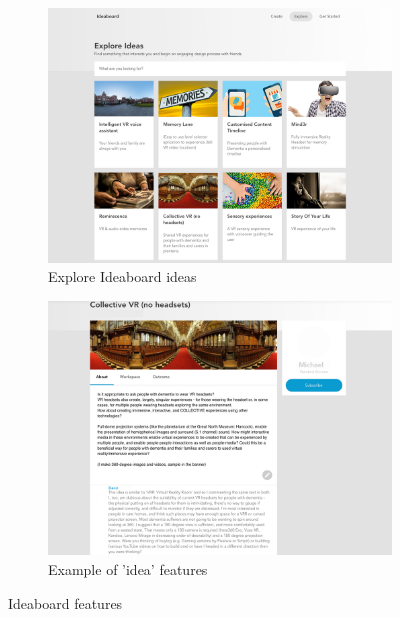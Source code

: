 \begin{figure}
\centering
\begin{subfigure}{.5\textwidth}
  \centering
  \includegraphics[width=.8\linewidth]{Images/Ideaboard Ideas.png}
  \caption{Explore Ideaboard ideas}
  \label{fig:exploreIdeaboard}
\end{subfigure}%
\begin{subfigure}{.5\textwidth}
  \centering
  \includegraphics[width=.8\linewidth]{Images/Example of idea.png}
  \caption{Example of 'idea' features}
  \label{fig:IdeaboardIdea}
\end{subfigure}
\caption{Ideaboard features}
\label{fig:IdeaboardFeatures}
\end{figure}

